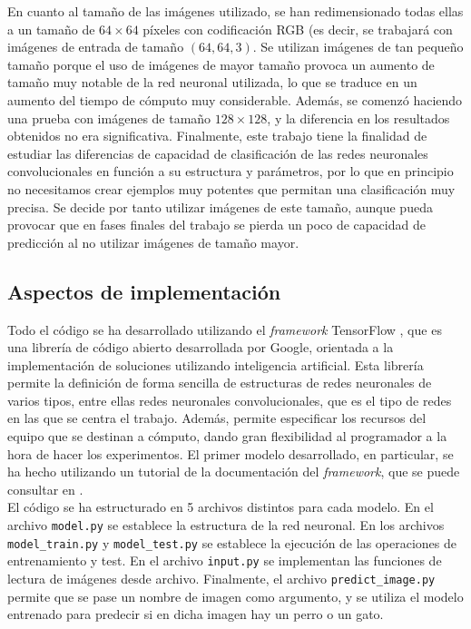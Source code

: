 \documentclass[11pt]{article}
\theoremstyle{plain}
\theoremstyle{definition}
\begin{document}
En cuanto al tamaño de las imágenes utilizado, se han redimensionado
todas ellas a un tamaño de $64 \times 64$ píxeles con codificación RGB
(es decir, se trabajará con imágenes de entrada de tamaño
$(64, 64, 3)$. Se utilizan imágenes de tan pequeño tamaño porque el
uso de imágenes de mayor tamaño provoca un aumento de tamaño muy
notable de la red neuronal utilizada, lo que se traduce en un aumento
del tiempo de cómputo muy considerable. Además, se comenzó haciendo
una prueba con imágenes de tamaño $128 \times 128$, y la diferencia en
los resultados obtenidos no era significativa. Finalmente, este
trabajo tiene la finalidad de estudiar las diferencias de capacidad de
clasificación de las redes neuronales convolucionales en función a su
estructura y parámetros, por lo que en principio no necesitamos crear
ejemplos muy potentes que permitan una clasificación muy precisa.
Se decide por tanto utilizar imágenes de este tamaño, aunque pueda
provocar que en fases finales del trabajo se pierda un poco de capacidad
de predicción al no utilizar imágenes de tamaño mayor.

\subsection{Aspectos de implementación}

Todo el código se ha desarrollado utilizando el \textit{framework}
TensorFlow \cite{tf}, que es una librería de código abierto
desarrollada por Google, orientada a la implementación de soluciones
utilizando inteligencia artificial. Esta librería permite la definición
de forma sencilla de estructuras de redes neuronales de varios tipos,
entre ellas redes neuronales convolucionales, que es el tipo de redes
en las que se centra el trabajo. Además, permite especificar los recursos
del equipo que se destinan a cómputo, dando gran flexibilidad al programador
a la hora de hacer los experimentos. El primer modelo desarrollado, en
particular, se ha hecho utilizando un tutorial de la documentación
del \textit{framework}, que se puede consultar en \cite{cnn-tutorial}.\\

El código se ha estructurado en 5 archivos distintos para cada modelo.
En el archivo \texttt{model.py} se establece la estructura de la red
neuronal. En los archivos \texttt{model\_train.py} y
\texttt{model\_test.py} se establece la ejecución de las operaciones
de entrenamiento y test.  En el archivo \texttt{input.py} se
implementan las funciones de lectura de imágenes desde
archivo. Finalmente, el archivo \texttt{predict\_image.py} permite que
se pase un nombre de imagen como argumento, y se utiliza el modelo
entrenado para predecir si en dicha imagen hay un perro o un gato.
\end{document}
